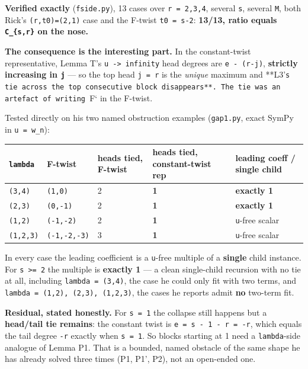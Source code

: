 \documentclass[11pt,a4paper]{article}
\begin{document}
\textbf{Verified exactly} (\mbox{\texttt{fside.py}}), 13 cases over \mbox{\texttt{r = 2,3,4}}, several \mbox{\texttt{s}}, several \mbox{\texttt{M}}, both Rick's \mbox{\texttt{(r,t0)=(2,1)}} case and the F-twist \mbox{\texttt{t0 = s-2}}: \textbf{13/13, ratio equals \mbox{\texttt{C\_\{s,r\}}} on the nose.}

\textbf{The consequence is the interesting part.} In the constant-twist representative, Lemma T's \mbox{\texttt{u -> infinity}} head degrees are \mbox{\texttt{e - (r-j)}}, \textbf{strictly increasing in \mbox{\texttt{j}}} --- so the top head \mbox{\texttt{j = r}} is the \emph{unique} maximum and **L3'\mbox{\texttt{s tie across the top consecutive block disappears**. The tie was an artefact of writing }}F` in the F-twist.

Tested directly on his two named obstruction examples (\mbox{\texttt{gap1.py}}, exact SymPy in \mbox{\texttt{u = w\_n}}):

\begin{center}\footnotesize
\begin{tabular}{@{}p{}p{}p{}p{}p{}@{}}
\hline
\textbf{\mbox{\texttt{lambda}}} & \textbf{F-twist} & \textbf{heads tied, F-twist} & \textbf{heads tied, constant-twist rep} & \textbf{leading coeff / single child}\\ \hline
\mbox{\texttt{(3,4)}} & \mbox{\texttt{(1,0)}} & 2 & \textbf{1} & \textbf{exactly 1}\\
\mbox{\texttt{(2,3)}} & \mbox{\texttt{(0,-1)}} & 2 & \textbf{1} & \textbf{exactly 1}\\
\mbox{\texttt{(1,2)}} & \mbox{\texttt{(-1,-2)}} & 2 & \textbf{1} & \mbox{\texttt{u}}-free scalar\\
\mbox{\texttt{(1,2,3)}} & \mbox{\texttt{(-1,-2,-3)}} & 3 & \textbf{1} & \mbox{\texttt{u}}-free scalar\\
\hline\end{tabular}\end{center}

In every case the leading coefficient is a \mbox{\texttt{u}}-free multiple of a \textbf{single} child instance. For \mbox{\texttt{s >= 2}} the multiple is \textbf{exactly 1} --- a clean single-child recursion with no tie at all, including \mbox{\texttt{lambda = (3,4)}}, the case he could only fit with two terms, and \mbox{\texttt{lambda = (1,2), (2,3), (1,2,3)}}, the cases he reports admit \textbf{no} two-term fit.

\textbf{Residual, stated honestly.} For \mbox{\texttt{s = 1}} the collapse still happens but a \textbf{head/tail tie remains}: the constant twist is \mbox{\texttt{e = s - 1 - r = -r}}, which equals the tail degree \mbox{\texttt{-r}} exactly when \mbox{\texttt{s = 1}}. So blocks starting at 1 need a \mbox{\texttt{lambda}}-side analogue of Lemma P1. That is a bounded, named obstacle of the same shape he has already solved three times (P1, P1', P2), not an open-ended one.
\end{document}
